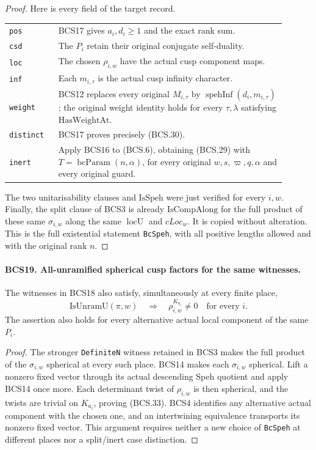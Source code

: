 \documentclass[11pt,a4paper]{article}
\numberwithin{equation}{section}
\theoremstyle{remark}\newtheorem{remark}[theorem]{Remark}
\begin{document}
\begin{proof}
Here is every field of the target record.
\begin{center}
\begin{tabular}{p{0.16\linewidth}p{0.74\linewidth}}
\texttt{pos} & BCS17 gives \(a_i,d_i\ge1\) and the exact rank sum.\\
\texttt{csd} & The \(P_i\) retain their original conjugate self-duality.\\
\texttt{loc} & The chosen \(\rho_{i,w}\) have the actual cusp component maps.\\
\texttt{inf} & Each \(m_{i,\tau}\) is the actual cusp infinity character.\\
\texttt{weight} & BCS12 replaces every original \(M_{i,\tau}\) by
\(\operatorname{spehInf}(d_i,m_{i,\tau})\); the original weight
identity holds for every \(\tau,\lambda\) satisfying
\(\mathrm{HasWeightAt}\).\\
\texttt{distinct} & BCS17 proves precisely (BCS.30).\\
\texttt{inert} & Apply BCS16 to (BCS.6), obtaining (BCS.29) with
\(T=\operatorname{bcParam}(n,\alpha)\), for every original
\(w,s,\varpi,q,\alpha\) and every original guard.\\
\end{tabular}
\end{center}
The two unitarisability clauses and \(\mathrm{IsSpeh}\) were just
verified for every \(i,w\).  Finally, the split clause of BCS3 is
already \(\mathrm{IsCompAlong}\) for the full product of these
same \(\sigma_{i,w}\) along the same \(\operatorname{locU}\)
and \(cLoc_w\).  It is copied without alteration.  This is the
full existential statement \texttt{Bc\allowbreak Speh}, with all positive
lengths allowed and with the original rank \(n\).
\end{proof}

\paragraph{BCS19. All-unramified spherical cusp factors for the same witnesses.}
\label{claim:BCS19}
The witnesses in BCS18 also satisfy, simultaneously at every finite
place,
\[
 \mathrm{IsUnramU}(\pi,w)\quad\Longrightarrow\quad
           \rho_{i,w}^{K_{a_i}}\ne0\quad\text{for every }i.
 \tag{BCS.33}
\]
The assertion also holds for every alternative actual local component
of the same \(P_i\).
\begin{proof}
The stronger \texttt{Definite\allowbreak N} witness retained in BCS3 makes the
full product of the \(\sigma_{i,w}\) spherical at every such
place.  BCS14 makes each \(\sigma_{i,w}\) spherical.  Lift a
nonzero fixed vector through its actual descending Speh quotient
and apply BCS14 once more.  Each determinant twist of
\(\rho_{i,w}\) is then spherical, and the twists are trivial on
\(K_{a_i}\), proving (BCS.33).  BCS4 identifies any alternative
actual component with the chosen one, and an intertwining
equivalence transports its nonzero fixed vector.  This argument
requires neither a new choice of \texttt{Bc\allowbreak Speh} at different places
nor a split/inert case distinction.
\end{proof}
\end{document}
